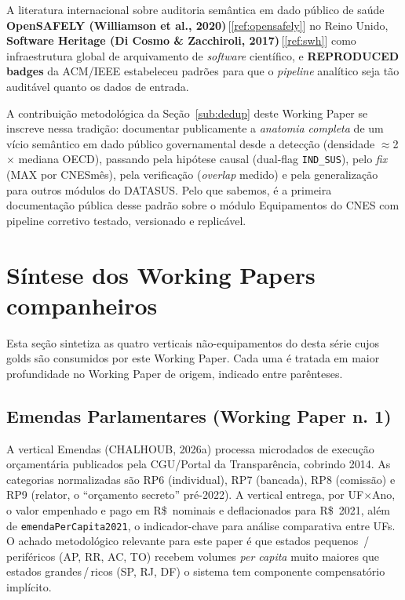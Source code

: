 \documentclass[12pt,a4paper,oneside]{article}
\newcommand{\rs}{R\$\,}
\begin{document}
A literatura internacional sobre auditoria semântica em dado público
de saúde \textendash{} \textbf{OpenSAFELY (Williamson et al.,
2020)}\,[\ref{ref:opensafely}] no Reino Unido,
\textbf{Software Heritage (Di Cosmo \& Zacchiroli,
2017)}\,[\ref{ref:swh}] como infraestrutura global de arquivamento
de \textit{software} científico, e \textbf{REPRODUCED badges} da
ACM/IEEE \textendash{} estabeleceu padrões para que o \textit{pipeline}
analítico seja tão auditável quanto os dados de entrada.

A contribuição metodológica da Seção~\ref{sub:dedup} deste Working
Paper se inscreve nessa tradição: documentar publicamente a
\textit{anatomia completa} de um vício semântico em dado público
governamental \textendash{} desde a detecção (densidade $\approx$2$\times$
mediana OECD), passando pela hipótese causal (dual-flag
\texttt{IND\_SUS}), pelo \textit{fix} (MAX por CNES\textendash mês),
pela verificação (\textit{overlap} medido) e pela generalização para
outros módulos do DATASUS. Pelo que sabemos, é a primeira
documentação pública desse padrão sobre o módulo Equipamentos do
CNES com pipeline corretivo testado, versionado e replicável.

\section{Síntese dos Working Papers companheiros}\label{sec:verticais}

Esta seção sintetiza as quatro verticais não-equipamentos do
desta série cujos golds são consumidos por este Working Paper. Cada
uma é tratada em maior profundidade no Working Paper de origem,
indicado entre parênteses.

\subsection{Emendas Parlamentares (Working Paper n. 1)}

A vertical Emendas (CHALHOUB, 2026a) processa microdados de
execução orçamentária publicados pela CGU/Portal da Transparência,
cobrindo 2014. As categorias normalizadas são
RP6 (individual), RP7 (bancada), RP8 (comissão) e RP9 (relator,
o ``orçamento secreto'' pré-2022). A vertical entrega, por
UF$\times$Ano, o valor empenhado e pago em \rs{} nominais e
deflacionados para \rs{} 2021, além de \texttt{emendaPerCapita2021},
o indicador-chave para análise comparativa entre UFs. O achado
metodológico relevante para este paper é que estados pequenos
\,/\,periféricos (AP, RR, AC, TO) recebem volumes \textit{per
capita} muito maiores que estados grandes\,/\,ricos (SP, RJ, DF)
\textemdash{} o sistema tem componente compensatório implícito.
\end{document}
